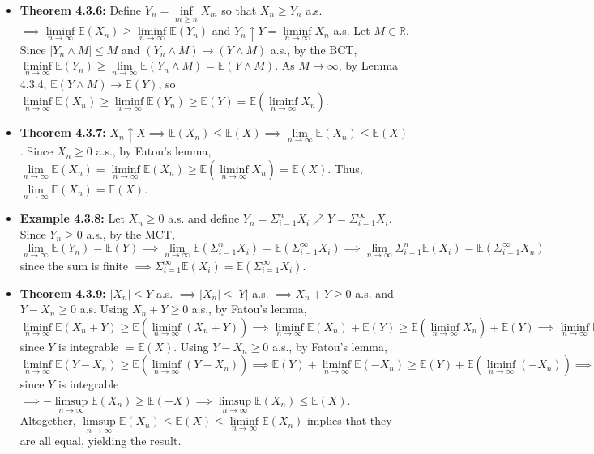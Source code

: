\documentclass[12pt]{article}
\newcommand{\E}{\mathbb{E}}
\begin{document}
\begin{itemize}
    \item \textbf{Theorem 4.3.6:} Define $Y_n = \inf \limits_{m \geq n} X_m$ so that $X_n \geq Y_n$ a.s. $\implies \liminf \limits_{n \to \infty} \E(X_n) \geq \liminf \limits_{n \to \infty} \E(Y_n)$ and $Y_n \uparrow Y = \liminf \limits_{n \to \infty} X_n$ a.s. Let $M \in \mathbb{R}$. Since $|Y_n \wedge M| \leq M$ and $(Y_n \wedge M) \to (Y \wedge M)$ a.s., by the BCT, $\liminf \limits_{n \to \infty} \E(Y_n) \geq \lim \limits_{n \to \infty} \E(Y_n \wedge M) = \E(Y \wedge M)$. As $M \to \infty$, by Lemma 4.3.4, $\E(Y \wedge M) \to \E(Y)$, so $\liminf \limits_{n \to \infty} \E(X_n) \geq \liminf \limits_{n \to \infty} \E(Y_n) \geq \E(Y) = \E(\liminf \limits_{n \to \infty} X_n)$.
    \item \textbf{Theorem 4.3.7:} $X_n \uparrow X \implies \E(X_n) \leq \E(X) \implies \lim \limits_{n \to \infty} \E(X_n) \leq \E(X)$. Since $X_n \geq 0$ a.s., by Fatou's lemma, $\lim \limits_{n \to \infty} \E(X_n) = \liminf \limits_{n \to \infty} \E(X_n) \geq \E(\liminf \limits_{n \to \infty} X_n) = \E(X)$. Thus, $\lim \limits_{n \to \infty} \E(X_n) = \E(X)$.
    \item \textbf{Example 4.3.8:} Let $X_n \geq 0$ a.s. and define $Y_n = \Sigma_{i=1}^n X_i \nearrow Y = \Sigma_{i=1}^\infty X_i$. Since $Y_n \geq 0$ a.s., by the MCT, $\lim \limits_{n \to \infty} \E(Y_n) = \E(Y) \implies \lim \limits_{n \to \infty} \E(\Sigma_{i=1}^n X_i) = \E(\Sigma_{i=1}^\infty X_i) \implies \lim \limits_{n \to \infty} \Sigma_{i=1}^n \E(X_i) = \E(\Sigma_{i=1}^\infty X_n)$ since the sum is finite $\implies \Sigma_{i=1}^\infty \E(X_i) = \E(\Sigma_{i=1}^\infty X_i)$.
    \item \textbf{Theorem 4.3.9:} $|X_n| \leq Y$ a.s. $\implies |X_n| \leq |Y|$ a.s. $\implies X_n + Y \geq 0$ a.s. and $Y - X_n \geq 0$ a.s. Using $X_n + Y \geq 0$ a.s., by Fatou's lemma, $\liminf \limits_{n \to \infty} \E(X_n + Y) \geq \E(\liminf \limits_{n \to \infty} (X_n + Y)) \implies \liminf \limits_{n \to \infty} \E(X_n) + \E(Y) \geq \E(\liminf \limits_{n \to \infty} X_n) + \E(Y) \implies \liminf \limits_{n \to \infty} \E(X_n) \geq \E(\liminf \limits_{n \to \infty} X_n)$ since $Y$ is integrable $= \E(X)$. Using $Y - X_n \geq 0$ a.s., by Fatou's lemma, $\liminf \limits_{n \to \infty} \E(Y - X_n) \geq \E(\liminf \limits_{n \to \infty} (Y - X_n)) \implies \E(Y) + \liminf \limits_{n \to \infty} \E(-X_n) \geq \E(Y) + \E(\liminf \limits_{n \to \infty} (-X_n)) \implies \liminf \limits_{n \to \infty} \E(-X_n) \geq \E(\liminf \limits_{n \to \infty} (-X_n))$ since $Y$ is integrable $\implies -\limsup \limits_{n \to \infty} \E(X_n) \geq \E(-X) \implies \limsup \limits_{n \to \infty} \E(X_n) \leq \E(X)$. Altogether, $\limsup \limits_{n \to \infty} \E(X_n) \leq \E(X) \leq \liminf \limits_{n \to \infty} \E(X_n)$ implies that they are all equal, yielding the result.

\end{itemize}
\end{document}
